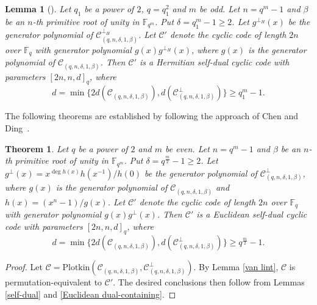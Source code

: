 \documentclass[10pt,a4paper]{amsart}
\newtheorem{theorem}{Theorem}
\newtheorem{lemma}{Lemma}
\begin{document}
\begin{lemma}[\cite{10856234}]
\label{odd Hermitian self-dual}
    Let $q_1$ be a power of $2$, $q=q_1^2$ and $m$ be odd. Let $n=q^m-1$ and $\beta$ be an $n$-th primitive root of unity in $\mathbb{F}_{q^m}$. Put $\delta=q_1^m-1\ge2$. Let $g^{\perp_H}(x)$ be the generator polynomial of $\mathcal{C}_{(q,n,\delta,1,\beta)}^{\perp_H}$. Let $\mathcal{C}'$ denote the cyclic code of length $2n$ over $\mathbb{F}_q$ with generator polynomial $g(x)g^{\perp_H}(x)$, where $g(x)$ is the generator polynomial of $\mathcal{C}_{(q,n,\delta,1,\beta)}$. Then $\mathcal{C}'$ is a Hermitian self-dual cyclic code with parameters $[2n,n,d]_q$, where \[d=\min\{2d(\mathcal{C}_{(q,n,\delta,1,\beta)}),d(\mathcal{C}_{(q,n,\delta,1,\beta)}^\perp)\}\ge q_1^m-1.\]
\end{lemma}

The following theorems are established by following the approach of Chen and Ding~\cite{10856234}.

\begin{theorem}
\label{even Euclidean self-dual}
    Let $q$ be a power of $2$ and $m$ be even. Let $n=q^m-1$ and $\beta$ be an $n$-th primitive root of unity in $\mathbb{F}_{q^m}$. Put $\delta=q^{\frac{m}{2}}-1\ge2$. Let $g^\perp(x)=x^{\deg h(x)}h(x^{-1})/h(0)$ be the generator polynomial of $\mathcal{C}_{(q,n,\delta,1,\beta)}^\perp$, where $g(x)$ is the generator polynomial of $\mathcal{C}_{(q,n,\delta,1,\beta)}$ and $h(x)=(x^n-1)/g(x)$. Let $\mathcal{C}'$ denote the cyclic code of length $2n$ over $\mathbb{F}_q$ with generator polynomial $g(x)g^\perp(x)$. Then $\mathcal{C}'$ is a Euclidean self-dual cyclic code with parameters $[2n,n,d]_q$, where \[d=\min\{2d(\mathcal{C}_{(q,n,\delta,1,\beta)}),d(\mathcal{C}_{(q,n,\delta,1,\beta)}^\perp)\}\ge q^{\frac{m}{2}}-1.\]
\end{theorem}
\begin{proof}
    Let $\mathcal{C}=\text{Plotkin}(\mathcal{C}_{(q,n,\delta,1,\beta)},\mathcal{C}^\perp_{(q,n,\delta,1,\beta)})$.
    By Lemma \ref{van lint}, $\mathcal{C}$ is permutation-equivalent to $\mathcal{C}'$. The desired conclusions then follow from Lemmas \ref{self-dual} and \ref{Euclidean dual-containing}.
\end{proof}
\end{document}
